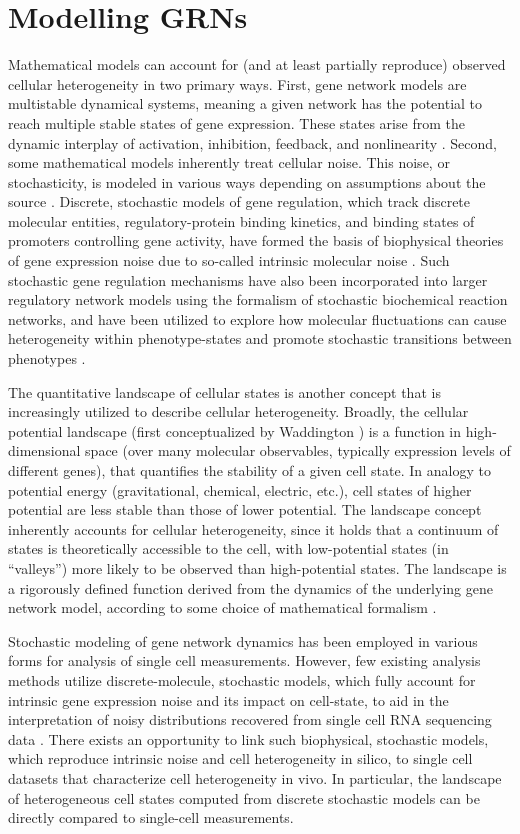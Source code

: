 \section{Modelling GRNs}
Mathematical models can account for (and at least partially reproduce) observed cellular heterogeneity in two primary ways. First, gene network models are multistable dynamical systems, meaning a given network has the potential to reach multiple stable states of gene expression. These states arise from the dynamic interplay of activation, inhibition, feedback, and nonlinearity \cite{K1} \cite{K42}. Second, some mathematical models inherently treat cellular noise. This noise, or stochasticity, is modeled in various ways depending on assumptions about the source \cite{K43} \cite{K44}. Discrete, stochastic models of gene regulation, which track discrete molecular entities, regulatory-protein binding kinetics, and binding states of promoters controlling gene activity, have formed the basis of biophysical theories of gene expression noise due to so-called intrinsic molecular noise \cite{K44} \cite{K45}. Such stochastic gene regulation mechanisms have also been incorporated into larger regulatory network models using the formalism of stochastic biochemical reaction networks, and have been utilized to explore how molecular fluctuations can cause heterogeneity within phenotype-states and promote stochastic transitions between phenotypes \cite{K46} \cite{K47}.

The quantitative landscape of cellular states is another concept that is increasingly utilized to describe cellular heterogeneity. Broadly, the cellular potential landscape (first conceptualized by Waddington \cite{K12}\cite{K13}) is a function in high-dimensional space (over many molecular observables, typically expression levels of different genes), that quantifies the stability of a given cell state. In analogy to potential energy (gravitational, chemical, electric, etc.), cell states of higher potential are less stable than those of lower potential. The landscape concept inherently accounts for cellular heterogeneity, since it holds that a continuum of states is theoretically accessible to the cell, with low-potential states (in “valleys”) more likely to be observed than high-potential states. The landscape is a rigorously defined function derived from the dynamics of the underlying gene network model, according to some choice of mathematical formalism \cite{K48}\cite{K12}. 

Stochastic modeling of gene network dynamics has been employed in various forms for analysis of single cell measurements. However, few existing analysis methods utilize discrete-molecule, stochastic models, which fully account for intrinsic gene expression noise and its impact on cell-state, to aid in the interpretation of noisy distributions recovered from single cell RNA sequencing data \cite{K10}\cite{K11}. There exists an opportunity to link such biophysical, stochastic models, which reproduce intrinsic noise and cell heterogeneity in silico, to single cell datasets that characterize cell heterogeneity in vivo. In particular, the landscape of heterogeneous cell states computed from discrete stochastic models can be directly compared to single-cell measurements.

